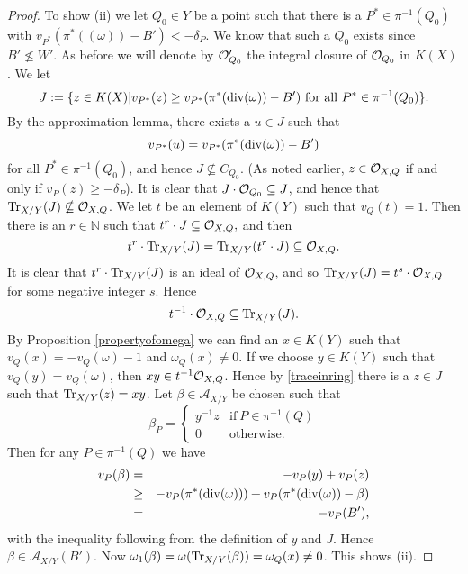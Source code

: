 \begin{proof}
To show (ii) we let $Q_0\in Y$ be a point such that there is a $P^*\in \pi^{-1}(Q_0)$ with $v_{P^*}(\pi^*((\omega)) - B') < -\delta_P$.
We know that such a $Q_0$ exists since $B' \nleq W'$.
As before we will denote by ${\cal O}_{Q_0}'$ the integral closure of ${\cal O}_{Q_0}$ in $K(X)$.
We let 
\[
 J := \{ z\in K(X) | v_{P^*}(z) \geq v_{P^*}(\pi^*(\operatorname{div} (\omega)) - B')\ \text{for all}\ P^*\in \pi^{-1}(Q_0)\}.
\]
By the approximation lemma, there exists a $u\in J$ such that 
\[
 v_{P^*}(u) = v_{P^*}(\pi^*(\operatorname{div} (\omega))-B')
 \]
 for all $P^*\in \pi^{-1}(Q_0)$, and hence $J\nsubseteq C_{Q_0}$.
(As noted earlier, $z\in {\cal O}_{X,Q}$ if and only if $v_P(z) \geq -\delta_P$).
It is clear that $J\cdot {\cal O}_{Q_0} \subseteq J$, and hence that $\operatorname{Tr}_{X/Y}(J) \nsubseteq {\cal O}_{X,Q}$.
We let $t$ be an element of $K(Y)$ such that $v_Q(t) = 1$.
Then there is an $r\in \mathbb N$ such that 
$t^r\cdot J \subseteq {\cal O}_{X,Q},
 $
 and then \[ t^r\cdot \operatorname{Tr}_{X/Y}(J) = \operatorname{Tr}_{X/Y}(t^r\cdot J) \subseteq {\cal O}_{X,Q}.\]
It is clear that $t^r\cdot \operatorname{Tr}_{X/Y} (J)$ is an ideal of ${\cal O}_{X,Q}$, and so $\operatorname{Tr}_{X/Y}(J) = t^s\cdot {\cal O}_{X,Q}$ for some negative integer $s$.
Hence 
\begin{equation}\label{traceinring}
 t^{-1}\cdot {\cal O}_{X,Q} \subseteq \operatorname{Tr}_{X/Y}(J).
\end{equation}
By Proposition \ref{propertyofomega} we can find an $x\in K(Y)$ such that $v_Q(x) = -v_Q(\omega) - 1$ and $\omega_Q(x) \neq 0$.
If we choose $y\in K(Y)$ such that $v_Q(y) = v_Q(\omega)$, then $xy \in t^{-1}{\cal O}_{X,Q}$.
Hence by \eqref{traceinring} there is a $z\in J$ such that $\operatorname{Tr}_{X/Y} (z) = xy$.
Let $\beta \in \mathcal{A}_{X/Y}$ be chosen  such that 
\begin{equation*}
 \beta_P = \begin{cases}
            y^{-1}z & \text{if}\ P\in \pi^{-1}(Q) \\
            0 & \text{otherwise}.
           \end{cases}
\end{equation*}
Then for any $P\in \pi^{-1}(Q)$ we have
\begin{eqnarray*}
 v_P(\beta) & = & -v_P(y) + v_P(z) \\
 & \geq & -v_P(\pi^*(\operatorname{div} (\omega))) + v_P(\pi^*(\operatorname{div} (\omega)) - \beta) \\
 & = & -v_P(B'),
\end{eqnarray*}
with the inequality following from the definition of $y$ and $J$.
Hence $\beta \in \mathcal{A}_{X/Y}(B')$.
Now $\omega_1(\beta) = \omega(\operatorname{Tr}_{X/Y}(\beta)) = \omega_Q(x) \neq 0$.
This shows (ii).


\end{proof}

